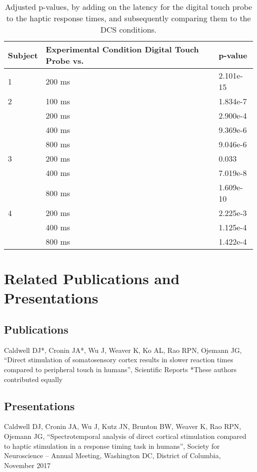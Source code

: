 \renewcommand{\tabcolsep}{1pt}
\renewcommand{\arraystretch}{0.7}
\begin{table}[ht]
	
	\scriptsize
	\begin{tabularx}{\textwidth}{@{}XXX@{}}
		\toprule
		Subject & Experimental Condition \newline Digital Touch Probe vs. & p-value \\
		\midrule
		1 & 200 ms & 2.101e-15 \\
		\midrule
		2 & 100 ms & 1.834e-7 \\
		& 200 ms	& 2.900e-4 \\ 
		& 400 ms	& 9.369e-6 \\
		& 800 ms	& 9.046e-6 \\
				\midrule
		3 &	200 ms & 0.033 \\
		& 400 ms &	7.019e-8 \\
		& 800 ms &	1.609e-10 \\
				\midrule
		4 &	200 ms &	2.225e-3 \\
		& 400 ms &	1.125e-4 \\ 
		& 800 ms &	1.422e-4 \\
		\bottomrule
	\end{tabularx}
	\caption[Adjusted statistics for haptic touch compared to DCS.]{Adjusted p-values, by adding on the latency for the digital touch probe to the haptic response times, and subsequently comparing them to the DCS conditions.}
	\label{table:RTsuppResponseTimes}
\end{table}

\section{Related Publications and Presentations}

\subsection{Publications}
\noindent Caldwell DJ*, Cronin JA*, Wu J, Weaver K, Ko AL, Rao RPN, Ojemann JG, “Direct stimulation of somatosensory cortex results in slower reaction times compared to peripheral touch in humans”, Scientific Reports *These authors contributed equally 
\medskip

\subsection{Presentations}

\noindent Caldwell DJ, Cronin JA, Wu J, Kutz JN, Brunton BW, Weaver K, Rao RPN, Ojemann JG, “Spectrotemporal analysis of direct cortical stimulation compared to haptic stimulation in a response timing task in humans”, Society for Neuroscience – Annual Meeting, Washington DC, District of Columbia, November 2017 
\medskip

